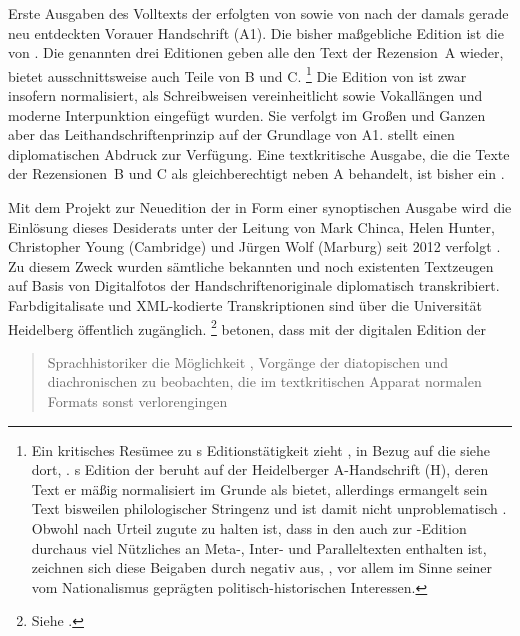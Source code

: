 Erste Ausgaben des Volltexts der \KC{} erfolgten von \citet{massmann:kukb}
sowie von \citet{diemer1849} nach der damals gerade neu entdeckten Vorauer
Handschrift (A1). Die bisher maßgebliche Edition ist die von
\citet{schroeder1895}. Die genannten drei Editionen geben alle den Text
der Rezension~A wieder, \citeauthor{massmann:kukb} bietet ausschnittsweise auch
Teile von B und C.%
%
	\footnote{Ein kritisches Resümee zu \citeauthor{massmann:kukb}s
		Editionstätigkeit zieht \citet{wolf2023}, in
		Bezug auf die \KC{} siehe dort, .
		\citeauthor{massmann:kukb}s Edition der \KC{} beruht auf der
		Heidelberger A-Handschrift (H), deren Text er mäßig normalisiert im
		Grunde als  bietet, allerdings ermangelt sein Text
		bisweilen philologischer Stringenz und ist damit nicht unproblematisch
		\autocite[125--126]{wolf2023}. Obwohl \citeauthor{massmann:kukb} nach
		 Urteil zugute zu halten ist, dass in den
		 auch zur \KC{}-Edition durchaus viel
		Nützliches an Meta-, Inter- und Paralleltexten
		enthalten ist, zeichnen sich diese Beigaben durch 
		negativ aus, ,
		vor allem im Sinne seiner vom Nationalismus geprägten
		politisch-historischen Interessen.%
	}
%
Die Edition von \citeauthor{schroeder1895} ist zwar insofern normalisiert, als
Schreibweisen vereinheitlicht sowie Vokal\-längen und moderne Interpunktion
eingefügt wurden. Sie verfolgt im Großen und Ganzen aber das
Leit\-handschriften\-prinzip auf der Grundlage von A1.
\citeauthor{diemer1849} stellt einen diplomatischen Abdruck zur Verfügung. Eine
textkritische Ausgabe, die die Texte der Rezensionen~B
und C als gleichberechtigt neben A behandelt, ist bisher ein .

Mit dem Projekt zur Neuedition der \KC{} in Form einer
synoptischen Ausgabe wird die Einlösung dieses Desiderats unter
der Leitung von Mark Chinca, Helen Hunter, Christopher Young (Cambridge) und
Jürgen Wolf (Marburg) seit 2012 verfolgt \autocite{chincaetal2019b}. Zu diesem
Zweck wurden sämtliche bekannten und noch existenten Textzeugen auf Basis von
Digitalfotos der Handschriften\-originale diplomatisch
transkribiert. Farb\-digitalisate und XML-ko\-dier\-te
Transkriptionen sind über die Universität Heidelberg öffentlich zugänglich.%
%
	\footnote{Siehe \nocite{kcdigital}.}
%
\citet[287]{chincaetal2019b} betonen, dass mit der digitalen Edition der
\KC{} \blockquote{Sprachhistoriker \textelp{} die Möglichkeit ,
Vorgänge der dia\-topischen und dia\-chronischen
 zu beobachten, die im textkritischen
Apparat normalen Formats sonst verlorengingen}.

